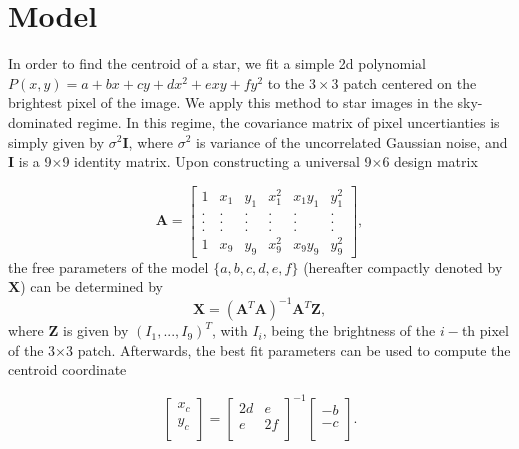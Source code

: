 \documentclass[12pt, preprint]{aastex}
\newcommand{\beq}{\begin{equation}}
\newcommand{\eeq}{\end{equation}}
\begin{document}
\section{Model}\label{sec:model}

In order to find the centroid of a star, we fit a simple 2d polynomial $P(x,y)=a+bx+cy+dx^2+exy+fy^2$ to the $3\times3$ patch centered on the brightest pixel of the
image. We apply this method to star images in the sky-dominated regime. In this regime, the covariance matrix of pixel uncertianties is simply given by $\sigma^{2}\mathbf{I}$, where $\sigma^{2}$ is variance of the uncorrelated Gaussian noise, and $\mathbf{I}$ is a 9$\times$9 identity matrix. Upon constructing a universal 9$\times$6 design matrix

\begin{equation}
    \mathbf{A} = 
    \begin{bmatrix}
        1 & x_{1} & y_{1} & x_{1}^{2} & x_{1}y_{1} & y_{1}^{2} \\
        . & . & . & . & . & .  \\
        . & . & . & . & . & .  \\
        . & . & . & . & . & .  \\
        1 & x_{9} & y_{9} & x_{9}^{2} & x_{9}y_{9} & y_{9}^{2}
    \end{bmatrix},
\end{equation}
the free parameters of the model $\{a,b,c,d,e,f\}$ (hereafter compactly denoted by $\mathbf{X}$) can be determined by 
\beq
\mathbf{X} = (\mathbf{A}^{T}\mathbf{A})^{-1}\mathbf{A}^{T}\mathbf{Z},
\label{linearfit}
\eeq
where $\mathbf{Z}$ is given by $(I_{1},...,I_{9})^{T}$, with $I_{i}$, being the brightness of the $i-$th pixel of the 3$\times$3 patch. Afterwards, the best fit parameters can be used to compute the centroid coordinate

\beq
  \begin{bmatrix}
      x_{c}\\
      y_{c}\\
  \end{bmatrix} = 
  \begin{bmatrix}
      2d & e\\
      e & 2f\\
  \end{bmatrix}^{-1}
  \begin{bmatrix}
      -b\\
      -c\\
  \end{bmatrix}.
\label{center}
\eeq
\end{document}
